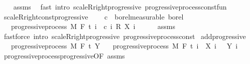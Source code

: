 \begin{isabellebody}
%
\isadelimproof
\ \ %
\endisadelimproof
%
\isatagproof
{}\isamarkupfalse%
\ assms\ \isamarkupfalse%
\ {\isacharparenleft}{\kern0pt}fast\ intro{\isacharcolon}{\kern0pt}\ scaleR{\isacharunderscore}{\kern0pt}right{\isacharunderscore}{\kern0pt}progressive\ progressive{\isacharunderscore}{\kern0pt}process{\isacharunderscore}{\kern0pt}const{\isacharunderscore}{\kern0pt}fun{\isacharparenright}{\kern0pt}%
\endisatagproof
{\isafoldproof}%
%
\isadelimproof
\isanewline
%
\endisadelimproof
\isanewline
{}\isamarkupfalse%
\ scaleR{\isacharunderscore}{\kern0pt}right{\isacharunderscore}{\kern0pt}const{\isacharunderscore}{\kern0pt}progressive{\isacharcolon}{\kern0pt}\ \isanewline
\ \ \ {\isachardoublequoteopen}c\ {\isasymin}\ borel{\isacharunderscore}{\kern0pt}measurable\ borel{\isachardoublequoteclose}\isanewline
\ \ \ {\isachardoublequoteopen}progressive{\isacharunderscore}{\kern0pt}process\ M\ F\ t\ {\isacharparenleft}{\kern0pt}{\isasymlambda}i\ {\isasymxi}{\isachardot}{\kern0pt}\ c\ i\ {\isacharasterisk}{\kern0pt}\isactrlsub R\ {\isacharparenleft}{\kern0pt}X\ i\ {\isasymxi}{\isacharparenright}{\kern0pt}{\isacharparenright}{\kern0pt}{\isachardoublequoteclose}\ \isanewline
%
\isadelimproof
\ \ %
\endisadelimproof
%
\isatagproof
{}\isamarkupfalse%
\ assms\ \isamarkupfalse%
\ {\isacharparenleft}{\kern0pt}fastforce\ intro{\isacharcolon}{\kern0pt}\ scaleR{\isacharunderscore}{\kern0pt}right{\isacharunderscore}{\kern0pt}progressive\ progressive{\isacharunderscore}{\kern0pt}process{\isacharunderscore}{\kern0pt}const{\isacharparenright}{\kern0pt}%
\endisatagproof
{\isafoldproof}%
%
\isadelimproof
\isanewline
%
\endisadelimproof
\isanewline
{}\isamarkupfalse%
\ add{\isacharunderscore}{\kern0pt}progressive{\isacharcolon}{\kern0pt}\isanewline
\ \ \ {\isachardoublequoteopen}progressive{\isacharunderscore}{\kern0pt}process\ M\ F\ t\ Y{\isachardoublequoteclose}\isanewline
\ \ \ {\isachardoublequoteopen}progressive{\isacharunderscore}{\kern0pt}process\ M\ F\ t\ {\isacharparenleft}{\kern0pt}{\isasymlambda}i\ {\isasymxi}{\isachardot}{\kern0pt}\ X\ i\ {\isasymxi}\ {\isacharplus}{\kern0pt}\ Y\ i\ {\isasymxi}{\isacharparenright}{\kern0pt}{\isachardoublequoteclose}\isanewline
%
\isadelimproof
\ \ %
\endisadelimproof
%
\isatagproof
{}\isamarkupfalse%
\ progressive{\isacharunderscore}{\kern0pt}process{\isachardot}{\kern0pt}progressive{\isacharbrackleft}{\kern0pt}OF\ assms{\isacharbrackright}{\kern0pt}\ \isamarkupfalse%

\end{isabellebody}
